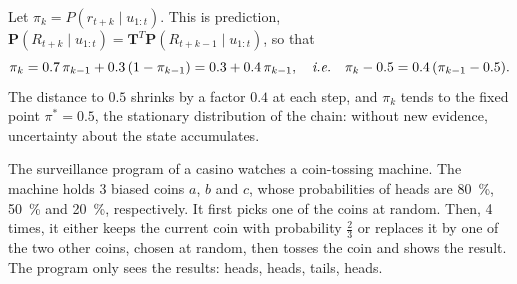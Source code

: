 \documentclass[11pt, a4paper]{exam}
\begin{document}
\begin{exercises}
\begin{parts}
    \begin{solution}
        Let $\pi_k = P(r_{t+k} \mid u_{1:t})$. This is prediction, $\mathbf{P}(R_{t+k} \mid u_{1:t}) = \mathbf{T}^T \mathbf{P}(R_{t+k-1} \mid u_{1:t})$, so that
        \[
            \pi_k = 0.7 \, \pi_{k-1} + 0.3 \, (1 - \pi_{k-1}) = 0.3 + 0.4 \, \pi_{k-1}, \quad \text{\ie{}} \quad \pi_k - 0.5 = 0.4 \, (\pi_{k-1} - 0.5).
        \]
        The distance to $0.5$ shrinks by a factor $0.4$ at each step, and $\pi_k$ tends to the fixed point $\pi^* = 0.5$, the stationary distribution of the chain: without new evidence, uncertainty about the state accumulates.
    \end{solution}
\end{parts}


The surveillance program of a casino watches a coin-tossing machine. The machine holds 3 biased coins $a$, $b$ and $c$, whose probabilities of heads are \qty{80}{\percent}, \qty{50}{\percent} and \qty{20}{\percent}, respectively. It first picks one of the coins at random. Then, 4 times, it either keeps the current coin with probability $\frac{2}{3}$ or replaces it by one of the two other coins, chosen at random, then tosses the coin and shows the result. The program only sees the results: heads, heads, tails, heads.

\end{exercises}
\end{document}
